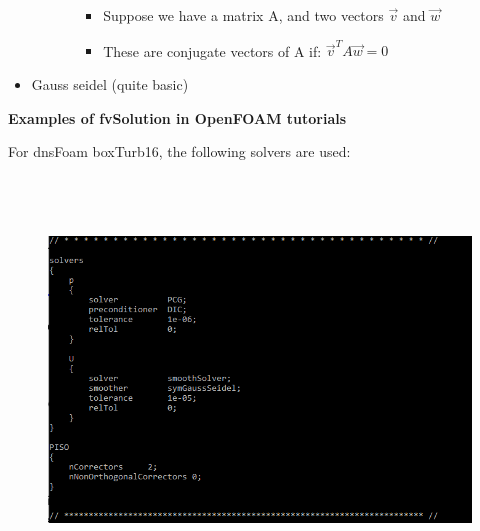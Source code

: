 \documentclass[12pt]{article}
\renewcommand{\_}{\kern-1.5pt\textunderscore\kern-1.5pt}
\begin{document}
\begin{itemize}
\begin{itemize}
\begin{itemize}
\begin{itemize}
	\item Suppose we have a matrix A, and two vectors  \( \overrightarrow{v} \)  and  \( \overrightarrow{w} \) \par

	\item These are conjugate vectors of A if:  \( \overrightarrow{v}^{T}A\overrightarrow{w}=0 \) \par


\end{itemize}
\end{itemize}
\end{itemize}
	\item Gauss seidel (quite basic)\par
\end{itemize}

\textbf{Examples of fvSolution in OpenFOAM tutorials}

For dnsFoam boxTurb16, the following solvers are used:\par




\begin{figure}[H]
	\begin{Center}
		\includegraphics[width=6.27in,height=4.25in]{./media/image10.png}
	\end{Center}
\end{figure}
\end{document}
